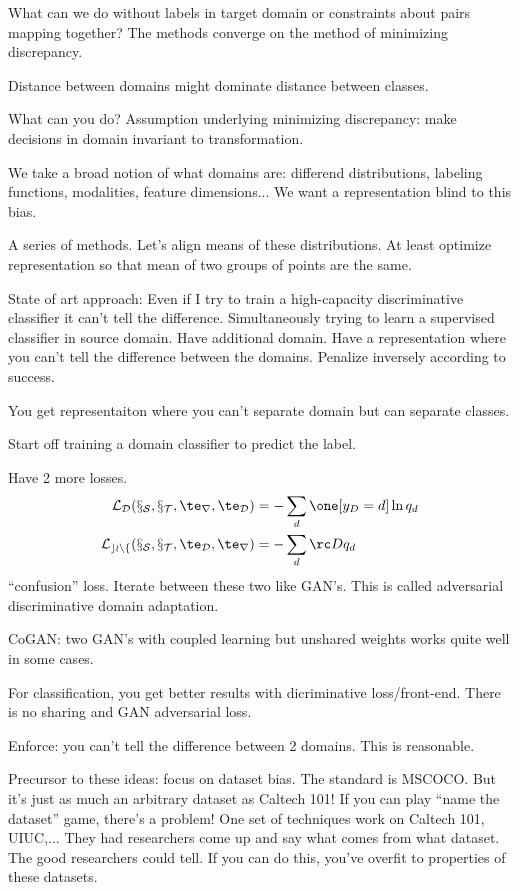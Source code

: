 What can we do without labels in target domain or constraints about pairs mapping together? The methods converge on the method of minimizing discrepancy.

Distance between domains might dominate distance between classes.

What can you do? Assumption underlying minimizing discrepancy: make decisions in domain invariant to transformation.

We take a broad notion of what domains are: differend distributions, labeling functions, modalities, feature dimensions... We want a representation blind to this bias. 

A series of methods. Let's align means of these distributions. At least optimize representation so that mean of two groups of points are the same.

State of art approach: Even if I try to train a high-capacity discriminative classifier it can't tell the difference. Simultaneously trying to learn a supervised classifier in source domain. Have additional domain. Have a representation where you can't tell the difference between the domains. Penalize inversely according to success. 

You get representaiton where you can't separate domain but can separate classes.

Start off training a domain classifier to predict the label.

Have 2 more losses.
\begin{align}
\cal L_D(x_S,x_T, \te_r, \te_D)&=-\sum_d \one[y_D = d]\ln q_d\\
\cal L_{conf}(x_S,x_T,\te_D, \te_r)
&=-\sum_d \rc D q_d
\end{align}
``confusion'' loss.
Iterate between these two like GAN's. 
This is called adversarial discriminative domain adaptation. 

CoGAN: two GAN's with coupled learning but unshared weights works quite well in some cases.

For classification, you get better results with dicriminative loss/front-end. There is no sharing and GAN adversarial loss.

Enforce: you can't tell the difference between 2 domains. This is reasonable.

Precursor to these ideas: focus on dataset bias. The standard is MSCOCO. But it's just as much an arbitrary dataset as Caltech 101! If you can play ``name the dataset'' game, there's a problem! One set of techniques work on Caltech 101, UIUC,... They had researchers come up and say what comes from what dataset. The good researchers could tell. If you can do this, you've overfit to properties of these datasets.

